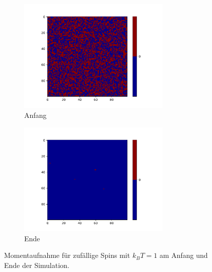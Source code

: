 \begin{figure}
  \begin{subfigure}{0.48\textwidth}
    \includegraphics[width = 0.8\textwidth]{A2/build/1kbt-a-zufall_anfang.pdf}
    \caption{Anfang}
  \end{subfigure}
  \begin{subfigure}{0.48\textwidth}
    \includegraphics[width = 0.8\textwidth]{A2/build/1kbt-a-zufall_ende.pdf}
    \caption{Ende}
  \end{subfigure}
  \caption{Momentaufnahme für zufällige Spins mit $k_B T =1$ am Anfang und Ende der Simulation.}
  \label{fig:randomOne}
\end{figure}

